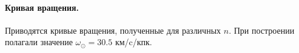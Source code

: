 \documentclass{matmex-diploma-custom}
\begin{document}
\pagebreak
\paragraph{Кривая вращения.} Приводятся кривые вращения, полученные для различных $n$. При построении полагали значение $\omega_{\odot} = 30.5$ км/c/кпк.


\pagebreak
\end{document}
